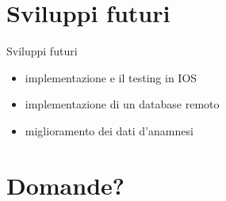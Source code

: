 \documentclass{beamer}
\begin{document}
    \section{Sviluppi futuri}
    \begin{frame}{Sviluppi futuri}
        \begin{itemize}
            \item implementazione e il testing in IOS
            \pause
            \item implementazione di un database remoto
            \pause
            \item miglioramento dei dati d'anamnesi
        \end{itemize}
    \end{frame}

    \section{Domande?}
\end{document}
